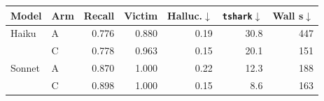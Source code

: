 \begin{tabular}{@{}llrrrrr@{}}
\toprule
Model & Arm & Recall & Victim & Halluc.$\downarrow$ & \texttt{tshark}$\downarrow$ & Wall s$\downarrow$ \\
\midrule
Haiku & A & 0.776 & 0.880 & 0.19 & 30.8 & 447 \\
 & C & 0.778 & 0.963 & 0.15 & 20.1 & 151 \\
\midrule
Sonnet & A & 0.870 & 1.000 & 0.22 & 12.3 & 188 \\
 & C & 0.898 & 1.000 & 0.15 & 8.6 & 163 \\
\bottomrule
\end{tabular}